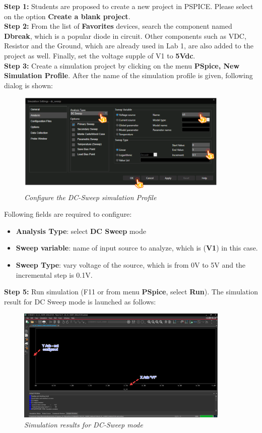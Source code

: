 \textbf{Step 1: } Students are proposed to create a new project in PSPICE. Please select on the option \textbf{Create a blank project}.\\

\textbf{Step 2: } From the list of \textbf{Favorites} devices, search the component named \textbf{Dbreak}, which is a popular diode in circuit. Other components such as VDC, Resistor and the Ground, which are already used in Lab 1, are also added to the project as well. Finally, set the voltage supple of V1 to \textbf{5Vdc}.\\

\textbf{Step 3: } Create a simulation project by clicking on the menu \textbf{PSpice, New Simulation Profile}. After the name of the simulation profile is given, following dialog is shown:

\begin{figure}[!htp]
    \centering
    \includegraphics[width=4in]{source/picture/bai_2/diode_2.PNG}
    \caption{\textit{Configure the DC-Sweep simulation Profile}}
    \label{bai2_pic02_config}
\end{figure}


Following fields are required to configure:
\begin{itemize}
    \item \textbf{Analysis Type}: select \textbf{DC Sweep} mode
    \item \textbf{Sweep variable}: name of input source to analyze, which is (\textbf{V1}) in this case.
    \item \textbf{Sweep Type}: vary voltage of the source, which is from 0V to 5V and the incremental step is 0.1V.
\end{itemize}


\textbf{Step 5: } Run simulation (F11 or from menu \textbf{PSpice}, select \textbf{Run}). The simulation result for DC Sweep mode is launched as follows:

\begin{figure}[!htp]
    \centering
    \includegraphics[width=4in]{source/picture/bai_2/12_RunSimulationNotConfigAxis.png}
    \caption{\textit{Simulation results for DC-Sweep mode}}
    \label{bai2_pic12}
\end{figure}

